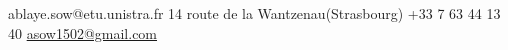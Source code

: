 \documentclass[lighthipster]{simplehipstercv}
\newlength{\rightcolwidth}
\begin{document}
\begin{paracol}{2}
\vfill{} %

\setlength{\parindent}{0pt}
\begin{minipage}[t]{\rightcolwidth}
\begin{center}\fontfamily{\sfdefault}\selectfont \color{black!70}
{\small ablaye.sow@etu.unistra.fr  14 route de la Wantzenau(Strasbourg) \newline {} +33 7 63 44 13 40  \protect\url{asow1502@gmail.com}
}
\end{center}
\end{minipage}

\end{paracol}
\end{document}
